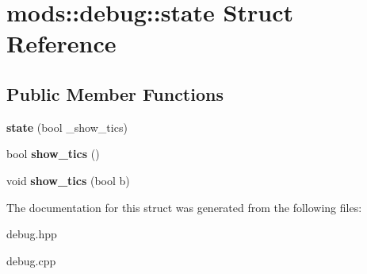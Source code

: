 \hypertarget{structmods_1_1debug_1_1state}{}\section{mods\+:\+:debug\+:\+:state Struct Reference}
\label{structmods_1_1debug_1_1state}
\subsection*{Public Member Functions}
\begin{DoxyCompactItemize}
\item 
\mbox{\label{structmods_1_1debug_1_1state_a69380bd3d04b38692ff5adbded990562}} 
{\bfseries state} (bool \+\_\+show\+\_\+tics)
\item 
\mbox{\label{structmods_1_1debug_1_1state_ad3af7cfe3bfeea3c5db170a709f665a2}} 
bool {\bfseries show\+\_\+tics} ()
\item 
\mbox{\label{structmods_1_1debug_1_1state_a85174b12355f2d4163238e045c0ab3f3}} 
void {\bfseries show\+\_\+tics} (bool b)
\end{DoxyCompactItemize}


The documentation for this struct was generated from the following files\+:\begin{DoxyCompactItemize}
\item 
debug.\+hpp\item 
debug.\+cpp\end{DoxyCompactItemize}
